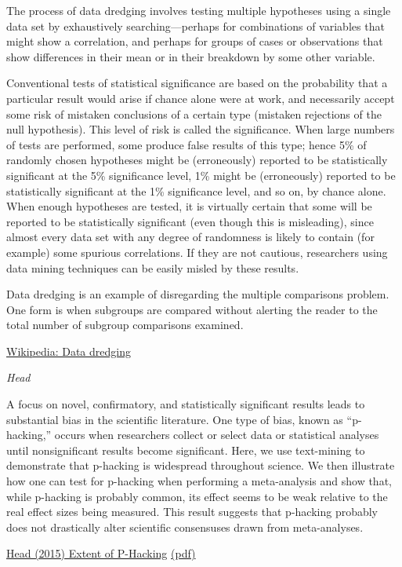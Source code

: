 \documentclass[
]{book}
\begin{document}
The process of data dredging involves testing multiple hypotheses using a single data set by exhaustively searching---perhaps for combinations of variables that might show a correlation, and perhaps for groups of cases or observations that show differences in their mean or in their breakdown by some other variable.

Conventional tests of statistical significance are based on the probability that a particular result would arise if chance alone were at work, and necessarily accept some risk of mistaken conclusions of a certain type (mistaken rejections of the null hypothesis). This level of risk is called the significance. When large numbers of tests are performed, some produce false results of this type; hence 5\% of randomly chosen hypotheses might be (erroneously) reported to be statistically significant at the 5\% significance level, 1\% might be (erroneously) reported to be statistically significant at the 1\% significance level, and so on, by chance alone. When enough hypotheses are tested, it is virtually certain that some will be reported to be statistically significant (even though this is misleading), since almost every data set with any degree of randomness is likely to contain (for example) some spurious correlations. If they are not cautious, researchers using data mining techniques can be easily misled by these results.

Data dredging is an example of disregarding the multiple comparisons problem. One form is when subgroups are compared without alerting the reader to the total number of subgroup comparisons examined.

\href{https://en.wikipedia.org/wiki/Data_dredging}{Wikipedia: Data dredging}

\emph{Head}

A focus on novel, confirmatory, and statistically significant results leads to substantial bias
in the scientific literature. One type of bias, known as ``p-hacking,'' occurs when researchers
collect or select data or statistical analyses until nonsignificant results become significant.
Here, we use text-mining to demonstrate that p-hacking is widespread throughout science.
We then illustrate how one can test for p-hacking when performing a meta-analysis and
show that, while p-hacking is probably common, its effect seems to be weak relative to the
real effect sizes being measured. This result suggests that p-hacking probably does not
drastically alter scientific consensuses drawn from meta-analyses.

\href{https://journals.plos.org/plosbiology/article?id=10.1371/journal.pbio.1002106}{Head (2015) Extent of P-Hacking}
\href{pdf/Head_2015_Extent_of_P-Hacking.pdf}{(pdf)}
\end{document}
